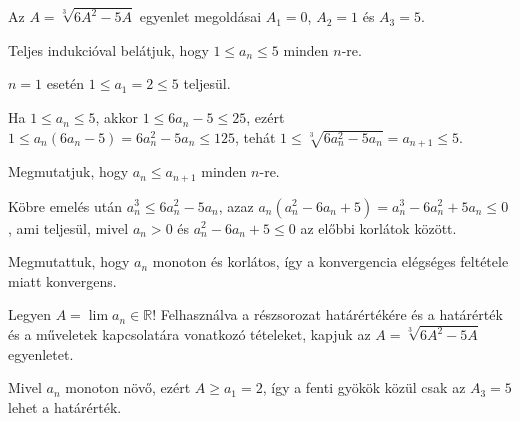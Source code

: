 \documentclass[11pt]{scrartcl}
\begin{document}
Az $A = \sqrt[3]{6A^2 - 5A}$ egyenlet megoldásai $A_1 = 0$, $A_2 = 1$ és
$A_3 = 5$.

Teljes indukcióval belátjuk, hogy $1 \le a_n \le 5$ minden $n$-re.

$n = 1$ esetén $1 \le a_1 = 2 \le 5$ teljesül.

Ha $1 \le a_n \le 5$, akkor $1 \le 6a_n - 5 \le 25$, ezért
$1 \le a_n (6a_n - 5) = 6a_n^2 - 5a_n \le 125$, tehát
$1 \le \sqrt[3]{6a_n^2 - 5a_n} = a_{n + 1} \le 5$.

Megmutatjuk, hogy $a_n \le a_{n + 1}$ minden $n$-re.

Köbre emelés után $a_n^3 \le 6a_n^2 - 5a_n$, azaz
$a_n (a_n^2 - 6a_n + 5) = a_n^3 - 6a_n^2 + 5a_n \le 0$, ami teljesül, mivel
$a_n > 0$ és $a_n^2 - 6a_n + 5 \le 0$ az előbbi korlátok között.

Megmutattuk, hogy $a_n$ monoton és korlátos, így a konvergencia elégséges
feltétele miatt konvergens.

Legyen $A = \lim a_n \in \mathbb{R}$! Felhasználva a részsorozat
határértékére és a határérték és a műveletek kapcsolatára vonatkozó
tételeket, kapjuk az $A = \sqrt[3]{6A^2 - 5A}$ egyenletet.

Mivel $a_n$ monoton növő, ezért $A \ge a_1 = 2$, így a fenti gyökök közül
csak az $A_3 = 5$ lehet a határérték.
\end{document}
